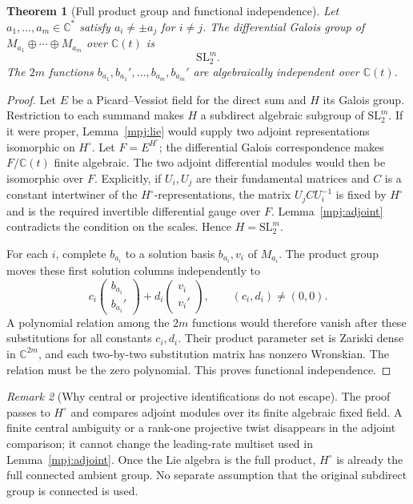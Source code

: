 \documentclass[11pt,a4paper]{article}
\newtheorem{theorem}{Theorem}[section]
\theoremstyle{definition}
\theoremstyle{remark}
\newtheorem{remark}[theorem]{Remark}
\numberwithin{equation}{section}
\begin{document}
\begin{theorem}[Full product group and functional independence]
\label{mpj:product}
Let $a_1,\ldots,a_m\in\mathbb C^*$ satisfy
$a_i\ne\pm a_j$ for $i\ne j$. The differential Galois group of
$M_{a_1}\oplus\cdots\oplus M_{a_m}$ over $\mathbb C(t)$ is
\[
                              \mathrm{SL}_2^m.
\]
The $2m$ functions
$b_{a_1},b_{a_1}',\ldots,b_{a_m},b_{a_m}'$
are algebraically independent over $\mathbb C(t)$.
\end{theorem}
\begin{proof}
Let $E$ be a Picard--Vessiot field for the direct sum and $H$ its
Galois group. Restriction to each summand makes $H$ a subdirect
algebraic subgroup of $\mathrm{SL}_2^m$. If it were proper,
Lemma~\ref{mpj:lie} would supply two adjoint representations
isomorphic on $H^\circ$. Let $F=E^{H^\circ}$; the differential
Galois correspondence makes $F/\mathbb C(t)$ finite algebraic.
The two adjoint differential modules would then be isomorphic
over $F$. Explicitly, if $U_i,U_j$ are their fundamental
matrices and $C$ is a constant intertwiner of the
$H^\circ$-representations, the matrix $U_jCU_i^{-1}$ is fixed
by $H^\circ$ and is the required invertible differential gauge
over $F$. Lemma~\ref{mpj:adjoint} contradicts the condition on
the scales. Hence $H=\mathrm{SL}_2^m$.

For each $i$, complete $b_{a_i}$ to a solution basis
$b_{a_i},v_i$ of $M_{a_i}$. The product group moves these
first solution columns independently to
\[
 c_i\begin{pmatrix}b_{a_i}\\b_{a_i}'\end{pmatrix}
 +d_i\begin{pmatrix}v_i\\v_i'\end{pmatrix},
 \qquad (c_i,d_i)\ne(0,0).
\]
A polynomial relation among the $2m$ functions would therefore
vanish after these substitutions for all constants $c_i,d_i$.
Their product parameter set is Zariski dense in $\mathbb C^{2m}$,
and each two-by-two substitution matrix has nonzero Wronskian.
The relation must be the zero polynomial. This proves functional
independence.
\end{proof}

\begin{remark}[Why central or projective identifications do not escape]
The proof passes to $H^\circ$ and compares adjoint modules over
its finite algebraic fixed field. A finite central ambiguity or
a rank-one projective twist disappears in the adjoint comparison;
it cannot change the leading-rate multiset used in
Lemma~\ref{mpj:adjoint}. Once the Lie algebra is the full product,
$H^\circ$ is already the full connected ambient group. No separate
assumption that the original subdirect group is connected is used.
\end{remark}
\end{document}
